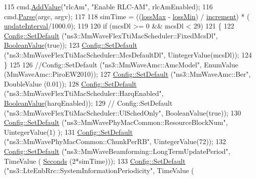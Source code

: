 \begin{DoxyCode}
115         cmd.\hyperlink{classns3_1_1CommandLine_addcfb546c7ad4c8bd0965654d55beb8e}{AddValue}(\textcolor{stringliteral}{"rlcAm"}, \textcolor{stringliteral}{"Enable RLC-AM"}, rlcAmEnabled);
116         cmd.\hyperlink{classns3_1_1CommandLine_a5c10b85b3207e5ecb48d907966923156}{Parse}(argc, argv);
117 
118         simTime = ((\hyperlink{mmwave-epc-amc-test_8cc_a3af69feb20a1e00eb0e56f03d201302d}{lossMax} - \hyperlink{mmwave-epc-amc-test_8cc_a9ca00a53092f2e9430cb7f39c9831c11}{lossMin}) / \hyperlink{mmwave-epc-amc-test_8cc_ac504dff76b24ab9f15536c51aec9fbbb}{increment}) * (
      \hyperlink{mmwave-epc-amc-test_8cc_adb43d41f676710da0bfbc1ca090e3076}{updateInterval}/1000.0);
119 
120         \textcolor{keywordflow}{if} (mcsDl >= 0 && mcsDl < 29)
121         \{
122                 \hyperlink{group__config_ga2e7882df849d8ba4aaad31c934c40c06}{Config::SetDefault} (\textcolor{stringliteral}{"ns3::MmWaveFlexTtiMacScheduler::FixedMcsDl"}, 
      \hyperlink{classns3_1_1BooleanValue}{BooleanValue}(\textcolor{keyword}{true}));
123                 \hyperlink{group__config_ga2e7882df849d8ba4aaad31c934c40c06}{Config::SetDefault} (\textcolor{stringliteral}{"ns3::MmWaveFlexTtiMacScheduler::McsDefaultDl"}, 
      UintegerValue(mcsDl));
124         \}
125 
126         \textcolor{comment}{//Config::SetDefault ("ns3::MmWaveAmc::AmcModel", EnumValue (MmWaveAmc::PiroEW2010));}
127         \hyperlink{group__config_ga2e7882df849d8ba4aaad31c934c40c06}{Config::SetDefault} (\textcolor{stringliteral}{"ns3::MmWaveAmc::Ber"}, DoubleValue (0.01));
128         \hyperlink{group__config_ga2e7882df849d8ba4aaad31c934c40c06}{Config::SetDefault} (\textcolor{stringliteral}{"ns3::MmWaveFlexTtiMacScheduler::HarqEnabled"}, 
      \hyperlink{classns3_1_1BooleanValue}{BooleanValue}(harqEnabled));
129 \textcolor{comment}{//      Config::SetDefault ("ns3::MmWaveFlexTtiMacScheduler::UlSchedOnly", BooleanValue(true));}
130         \hyperlink{group__config_ga2e7882df849d8ba4aaad31c934c40c06}{Config::SetDefault} (\textcolor{stringliteral}{"ns3::MmWavePhyMacCommon::ResourceBlockNum"}, UintegerValue(1)
      );
131         \hyperlink{group__config_ga2e7882df849d8ba4aaad31c934c40c06}{Config::SetDefault} (\textcolor{stringliteral}{"ns3::MmWavePhyMacCommon::ChunkPerRB"}, UintegerValue(72));
132         \hyperlink{group__config_ga2e7882df849d8ba4aaad31c934c40c06}{Config::SetDefault} (\textcolor{stringliteral}{"ns3::MmWaveBeamforming::LongTermUpdatePeriod"}, TimeValue (
      \hyperlink{group__timecivil_ga33c34b816f8ff6628e33d5c8e9713b9e}{Seconds} (2*simTime)));
133         \hyperlink{group__config_ga2e7882df849d8ba4aaad31c934c40c06}{Config::SetDefault} (\textcolor{stringliteral}{"ns3::LteEnbRrc::SystemInformationPeriodicity"}, TimeValue (

\end{DoxyCode}
